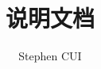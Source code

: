 \usepackage{amsmath, amssymb}
\usepackage{ctex}
\usepackage{bm}
\usepackage{algorithm2e}
\usepackage{mathptmx}
\title{说明文档}
\author{Stephen CUI}
\usepackage[
    left=2.45cm,
    right=2.45cm,
    top=2.77cm,
    bottom=2.77cm
]{geometry}